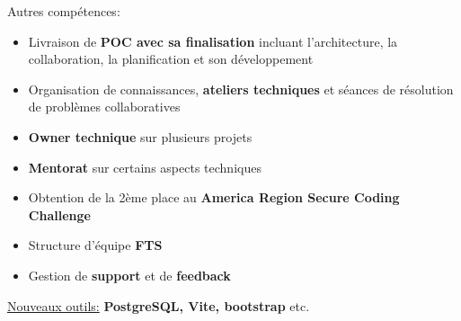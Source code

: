 \documentclass[10pt,a4paper,ragged2e,withhyper]{altacv}
\begin{document}
Autres compétences:
\begin{itemize}
  \item Livraison de \textbf{POC avec sa finalisation} incluant l'architecture, la collaboration, la planification et son développement
  \item Organisation de connaissances, \textbf{ateliers techniques} et séances de résolution de problèmes collaboratives
  \item \textbf{Owner technique} sur plusieurs projets
  \item \textbf{Mentorat} sur certains aspects techniques
  \item Obtention de la 2ème place au \textbf{America Region Secure Coding Challenge}
  \item Structure d'équipe \textbf{FTS}
  \item Gestion de \textbf{support} et de \textbf{feedback}
\end{itemize}
\begin{itshape}
  \underline{Nouveaux outils:}
  \small{\textbf{PostgreSQL, Vite, bootstrap} etc.}
\end{itshape}

\divider
\end{document}
